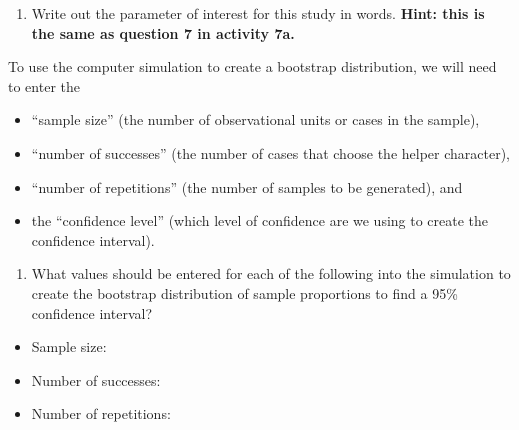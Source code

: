 \documentclass[
]{report}
\providecommand{\tightlist}{%
  \setlength{\itemsep}{0pt}\setlength{\parskip}{0pt}}
\begin{document}
\begin{enumerate}
\def\labelenumi{\arabic{enumi}.}
\setcounter{enumi}{3}
\tightlist
\item
  Write out the parameter of interest for this study in words. \textbf{Hint: this is the same as question 7 in activity 7a.}
\end{enumerate}

\vspace{0.5in}

To use the computer simulation to create a bootstrap distribution, we will need to enter the

\begin{itemize}
\tightlist
\item
  ``sample size'' (the number of observational units or cases in the sample),
\item
  ``number of successes'' (the number of cases that choose the helper character),
\item
  ``number of repetitions'' (the number of samples to be generated), and
\item
  the ``confidence level'' (which level of confidence are we using to create the confidence interval).
\end{itemize}

\begin{enumerate}
\def\labelenumi{\arabic{enumi}.}
\setcounter{enumi}{4}
\tightlist
\item
  What values should be entered for each of the following into the simulation to create the bootstrap distribution of sample proportions to find a 95\% confidence interval?
  \vspace{1mm}
\end{enumerate}

\begin{itemize}
\tightlist
\item
  Sample size:
\end{itemize}

\vspace{.1in}

\begin{itemize}
\tightlist
\item
  Number of successes:
\end{itemize}

\vspace{.1in}

\begin{itemize}
\tightlist
\item
  Number of repetitions:
\end{itemize}
\end{document}
